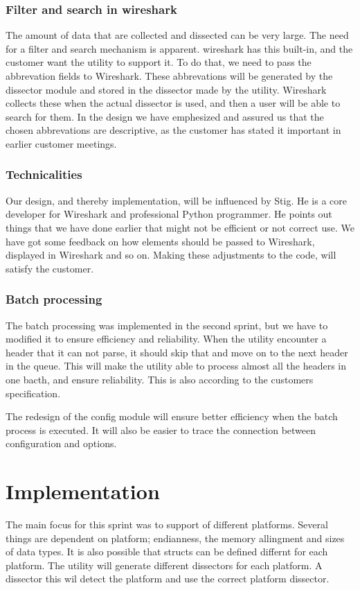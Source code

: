 \subsubsection{Filter and search in \Gls{wireshark}}
The amount of data that are collected and dissected can be very large. The need for a filter and search mechanism is apparent. \Gls{wireshark} has this built-in, and the customer want the \gls{utility} to support it. To do that, we need to pass the abbrevation fields to Wireshark. These abbrevations will be generated by the dissector module and stored in the dissector made by the utility. Wireshark collects these when the actual dissector is used, and then a user will be able to search for them. In the design we have emphesized and assured us that the chosen abbrevations are descriptive, as the customer has stated it important in earlier customer meetings. 

\subsubsection{Technicalities}
Our design, and thereby implementation, will be influenced by Stig. He is a core developer for Wireshark and professional Python programmer. He points out things that we have done earlier that might not be efficient or not correct use. We have got some feedback on how elements should be passed to Wireshark, displayed in Wireshark and so on. Making these adjustments to the code, will satisfy the customer. 

\subsubsection{Batch processing}
The batch processing was implemented in the second sprint, but we have to modified it to ensure efficiency and reliability. When the utility encounter a header that it can not parse, it should skip that and move on to the next header in the queue. This will make the utility able to process almost all the headers in one bacth, and ensure reliability. This is also according to the customers specification.

The redesign of the config module will ensure better efficiency when the batch process is executed. It will also be easier to trace the connection between configuration and options. 


\section{Implementation}
The main focus for this sprint was to support of different platforms. Several 
things are dependent on platform; \gls{endianness}, the memory allingment and sizes 
of data types. It is also possible that structs can be defined differnt for 
each platform. The \gls{utility} will generate different \glspl{dissector} for each 
platform. A \gls{dissector} this wil detect the platform and use the correct 
platform \gls{dissector}.

